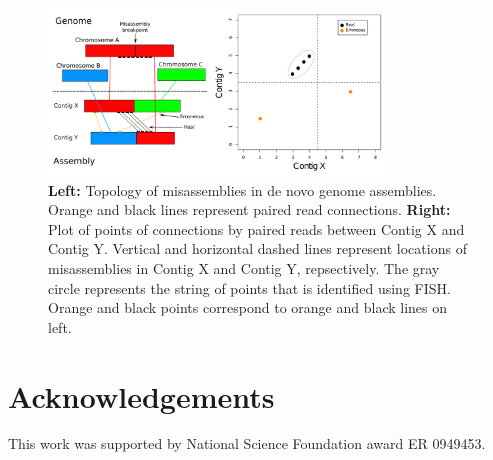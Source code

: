 \documentclass{bioinfo}
\begin{document}
\begin{figure}[t]
\includegraphics[width=3.5in]{fish-qc.pdf}
\vspace{-1cm}
\caption{\textbf{Left:} Topology of misassemblies in de novo genome assemblies. Orange and black lines represent paired read 
connections. \textbf{Right:} Plot of points of connections by paired reads between Contig X and Contig Y. Vertical and horizontal 
dashed lines represent locations of misassemblies in Contig X and Contig Y, repsectively. The gray circle represents the string of points
that is identified using FISH. Orange and black points correspond to orange and black lines on left.}\label{fig:02}
\end{figure}




\section*{Acknowledgements}
This work was supported by National Science Foundation award ER 0949453.



\end{document}
